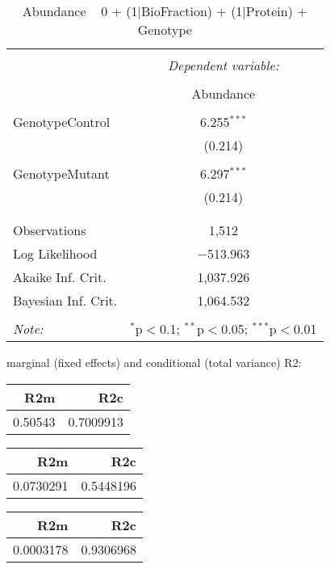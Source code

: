 \documentclass[11pt]{report}
\begin{document}
\begin{table}[!htbp] \centering 
  \caption{Abundance ~ 0 + (1|BioFraction) + (1|Protein) + Genotype} 
  \label{} 
\begin{tabular}{@{\extracolsep{5pt}}lc} 
\\[-1.8ex]\hline 
\hline \\[-1.8ex] 
 & \multicolumn{1}{c}{\textit{Dependent variable:}} \\ 
\cline{2-2} 
\\[-1.8ex] & Abundance \\ 
\hline \\[-1.8ex] 
 GenotypeControl & 6.255$^{***}$ \\ 
  & (0.214) \\ 
  & \\ 
 GenotypeMutant & 6.297$^{***}$ \\ 
  & (0.214) \\ 
  & \\ 
\hline \\[-1.8ex] 
Observations & 1,512 \\ 
Log Likelihood & $-$513.963 \\ 
Akaike Inf. Crit. & 1,037.926 \\ 
Bayesian Inf. Crit. & 1,064.532 \\ 
\hline 
\hline \\[-1.8ex] 
\textit{Note:}  & \multicolumn{1}{r}{$^{*}$p$<$0.1; $^{**}$p$<$0.05; $^{***}$p$<$0.01} \\ 
\end{tabular} 
\end{table} 
marginal (fixed effects) and conditional (total variance) R2:

\begin{tabular}{r|r}
\hline
R2m & R2c\\
\hline
0.50543 & 0.7009913\\
\hline
\end{tabular}

\begin{tabular}{r|r}
\hline
R2m & R2c\\
\hline
0.0730291 & 0.5448196\\
\hline
\end{tabular}

\begin{tabular}{r|r}
\hline
R2m & R2c\\
\hline
0.0003178 & 0.9306968\\
\hline
\end{tabular}
\end{document}
